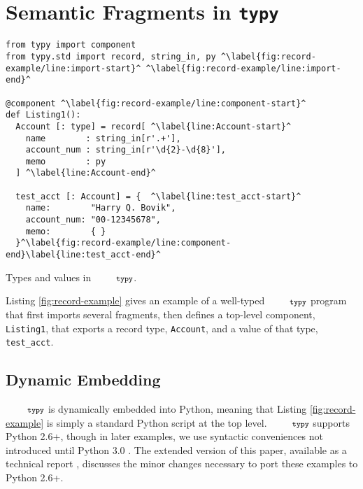 \documentclass[10pt]{sigplanconf}
\newif\ifext
\newcommand{\typy}{\texttt{\footnotesize typy}}
\newcommand{\lip}[1]{\lstinline[language=Python,basicstyle=\ttfamily\footnotesize,morekeywords={with},deletendkeywords={tuple,buffer,map}]{#1}}
\begin{document}
\section{Semantic Fragments in \texttt{typy}}\label{sec:typy-by-example}
\begin{codelisting}[t]
\vspace{-3px}
\begin{lstlisting}
from typy import component
from typy.std import record, string_in, py ^\label{fig:record-example/line:import-start}^ ^\label{fig:record-example/line:import-end}^

@component ^\label{fig:record-example/line:component-start}^
def Listing1():
  Account [: type] = record[ ^\label{line:Account-start}^
    name        : string_in[r'.+'],
    account_num : string_in[r'\d{2}-\d{8}'],
    memo        : py
  ] ^\label{line:Account-end}^

  test_acct [: Account] = {  ^\label{line:test_acct-start}^
    name:        "Harry Q. Bovik",
    account_num: "00-12345678",
    memo:        { }
  }^\label{fig:record-example/line:component-end}\label{line:test_acct-end}^
\end{lstlisting}
\caption{Types and values in $\typy $.}
\label{fig:record-example}
\end{codelisting}

Listing \ref{fig:record-example} gives an example of a well-typed $\typy$ program that first imports several fragments, then defines a top-level {component}, \lip{Listing1}, that exports a record type, \lip{Account}, and a value of that type, \lip{test_acct}.

\subsection{Dynamic Embedding} 
$\typy$ is dynamically embedded into Python, meaning that Listing \ref{fig:record-example} is simply a standard Python script at the top level. $\typy$ supports Python 2.6+, though in later examples, we use syntactic conveniences not introduced until Python 3.0 \cite{pep3107}. \ifext Appendix \ref{sec:python2-support} \else The extended version of this paper, available as a technical report \cite{gpce16tr}, \fi discusses the minor changes necessary to port these examples to Python 2.6+.%
\end{document}
